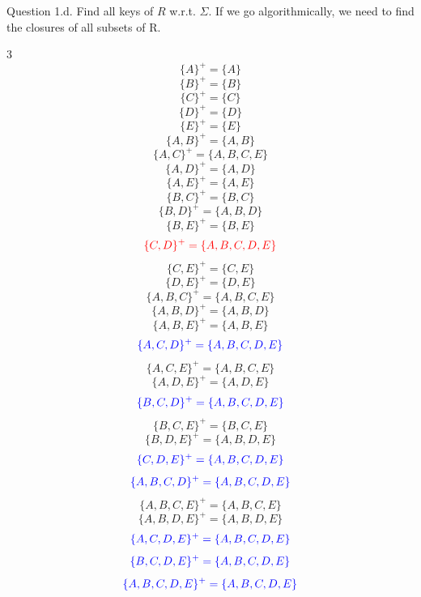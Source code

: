 \documentclass{beamer}
\begin{document}
\begin{frame}[fragile]{Question 1.d.}
Find all keys of $R$ w.r.t. $\Sigma$.
\pause
If we go algorithmically, we need to find the closures of all subsets of R.
\pause
\tiny
\begin{multicols}{3}
\noindent
\[
\{A\}^{+}=\{A\}
\]
\[
\{B\}^{+}=\{B\}
\]
\[
\{C\}^{+}=\{C\}
\]
\[
\{D\}^{+}=\{D\}
\]
\[
\{E\}^{+}=\{E\}
\]
\[
\{A,B\}^{+}=\{A,B\}
\]
\[
\{A,C\}^{+}=\{A,B,C,E\}
\]
\[
\{A,D\}^{+}=\{A,D\}
\]
\[
\{A,E\}^{+}=\{A,E\}
\]
\[
\{B,C\}^{+}=\{B,C\}
\]
\[
\{B,D\}^{+}=\{A,B,D\}
\]
\[
\{B,E\}^{+}=\{B,E\}
\]
\[
\textcolor{red}{\{C,D\}^{+}=\{A,B,C,D,E\}}
\]
\[
\{C,E\}^{+}=\{C,E\}
\]
\[
\{D,E\}^{+}=\{D,E\}
\]
\[
\{A,B,C\}^{+}=\{A,B,C,E\}
\]
\[
\{A,B,D\}^{+}=\{A,B,D\}
\]
\[
\{A,B,E\}^{+}=\{A,B,E\}
\]
\[
\textcolor{blue}{\{A,C,D\}^{+}=\{A,B,C,D,E\}}
\]
\[
\{A,C,E\}^{+}=\{A,B,C,E\}
\]
\[
\{A,D,E\}^{+}=\{A,D,E\}
\]
\[
\textcolor{blue}{\{B,C,D\}^{+}=\{A,B,C,D,E\}}
\]
\[
\{B,C,E\}^{+}=\{B,C,E\}
\]
\[
\{B,D,E\}^{+}=\{A,B,D,E\}
\]
\[
\textcolor{blue}{\{C,D,E\}^{+}=\{A,B,C,D,E\}}
\]
\[
\textcolor{blue}{\{A,B,C,D\}^{+}=\{A,B,C,D,E\}}
\]
\[
\{A,B,C,E\}^{+}=\{A,B,C,E\}
\]
\[
\{A,B,D,E\}^{+}=\{A,B,D,E\}
\]
\[
\textcolor{blue}{\{A,C,D,E\}^{+}=\{A,B,C,D,E\}}
\]
\[
\textcolor{blue}{\{B,C,D,E\}^{+}=\{A,B,C,D,E\}}
\]
\[
\textcolor{blue}{\{A,B,C,D,E\}^{+}=\{A,B,C,D,E\}}
\]
\end{multicols}
\end{frame}
\end{document}
